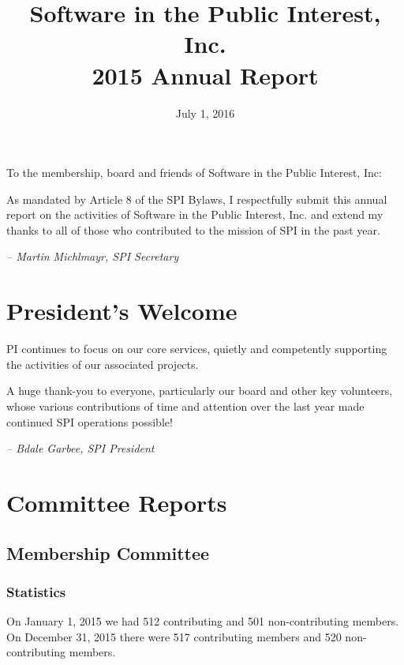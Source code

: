 \documentclass[letterpaper]{report}
\begin{document}
\title{Software in the Public Interest, Inc.\\
2015 Annual Report}
\date{July 1, 2016}

\maketitle

To the membership, board and friends of Software in the Public Interest, Inc:

As mandated by Article 8 of the SPI Bylaws, I respectfully submit this annual
report on the activities of Software in the Public Interest, Inc. and extend my
thanks to all of those who contributed to the mission of SPI in the past year.

  \emph{-- Martin Michlmayr, SPI Secretary}

\newpage

\tableofcontents

\newpage

\chapter{President's Welcome}
\label{sec:president}

PI continues to focus on our core services, quietly and competently
supporting the activities of our associated projects.

A huge thank-you to everyone, particularly our board and other key
volunteers, whose various contributions of time and attention over the last
year made continued SPI operations possible!

  \emph{-- Bdale Garbee, SPI President}

\chapter{Committee Reports}
\section{Membership Committee}

\subsection{Statistics}

On January 1, 2015 we had 512 contributing and 501 non-contributing members.
On December 31, 2015 there were 517 contributing members and 520 non-contributing
members.
\end{document}
